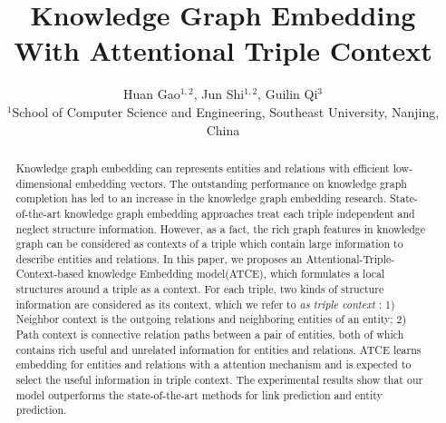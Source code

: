 \documentclass{article}
\title{Knowledge Graph Embedding With Attentional Triple Context}
\author{Huan Gao$^{1,2}$, Jun Shi$^{1,2}$, Guilin Qi$^{3}$\\
$^{1}$School of Computer Science and Engineering,
Southeast University, Nanjing, China  \\
}
\begin{document}
\maketitle

\begin{abstract}
    Knowledge graph embedding can represents entities and relations with efficient low-dimensional embedding vectors. The outstanding performance on knowledge graph completion has led to an increase in the knowledge graph embedding research. State-of-the-art knowledge graph embedding approaches treat each triple independent and neglect structure information. However, as a fact, the rich graph features in knowledge graph can be considered as contexts of a triple which contain large information to describe entities and relations. In this paper, we proposes an Attentional-Triple-Context-based knowledge Embedding model(ATCE), which formulates a local structures around a triple as a context. For each triple, two kinds of structure information are considered as its context, which we refer to \emph{as triple context} : 1) Neighbor context is the outgoing relations and neighboring entities of an entity; 2) Path context is connective relation paths between a pair of entities, both of which contains rich useful and unrelated information for entities and relations. ATCE learns embedding for entities and relations with a attention mechanism and is expected to select the useful information in triple context. The experimental results show that our model outperforms the state-of-the-art methods for link prediction and entity prediction.
\end{abstract}












%

\end{document}
